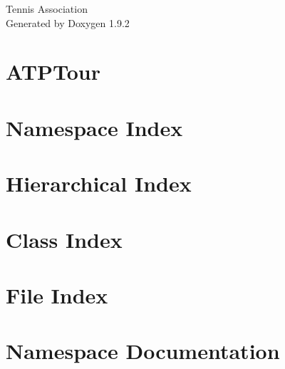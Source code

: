 \documentclass[twoside]{book}
\newcommand{\+}{\discretionary{\mbox{\scriptsize$\hookleftarrow$}}{}{}}
\newcommand{\clearemptydoublepage}{%
    \newpage{\pagestyle{empty}\cleardoublepage}%
  }
\begin{document}
  \raggedbottom
    \hypersetup{pageanchor=false,
                bookmarksnumbered=true,
                pdfencoding=unicode
               }
  \begin{titlepage}
  \vspace*{7cm}
  \begin{center}%
  {\Large Tennis Association}\\
  \vspace*{1cm}
  {\large Generated by Doxygen 1.9.2}\\
  \end{center}
  \end{titlepage}
  \clearemptydoublepage
  \tableofcontents
  \clearemptydoublepage
  \hypersetup{pageanchor=true}
\chapter{ATPTour}
\label{index}\hypertarget{index}{}
\chapter{Namespace Index}

\chapter{Hierarchical Index}

\chapter{Class Index}

\chapter{File Index}

\chapter{Namespace Documentation}






\end{document}

